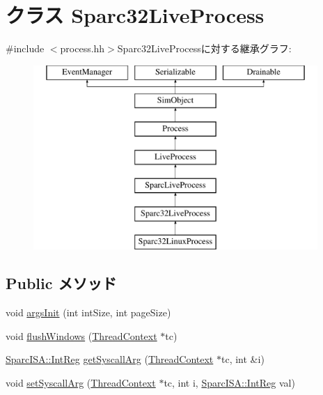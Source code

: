\hypertarget{classSparc32LiveProcess}{
\section{クラス Sparc32LiveProcess}
\label{classSparc32LiveProcess}
}


{\ttfamily \#include $<$process.hh$>$}Sparc32LiveProcessに対する継承グラフ:\begin{figure}[H]
\begin{center}
\leavevmode
\includegraphics[height=7cm]{classSparc32LiveProcess}
\end{center}
\end{figure}
\subsection*{Public メソッド}
\begin{DoxyCompactItemize}
\item 
void \hyperlink{classSparc32LiveProcess_a60e5314ffeede1e51c6bcb2cf606ca92}{argsInit} (int intSize, int pageSize)
\item 
void \hyperlink{classSparc32LiveProcess_ac36137c98f2b65736e0c5745c3c90c85}{flushWindows} (\hyperlink{classThreadContext}{ThreadContext} $\ast$tc)
\item 
\hyperlink{namespaceSparcISA_a0e080577527fb3e9685399f75b5caf15}{SparcISA::IntReg} \hyperlink{classSparc32LiveProcess_abab14482db5480cf54186cb10b08491e}{getSyscallArg} (\hyperlink{classThreadContext}{ThreadContext} $\ast$tc, int \&i)
\item 
void \hyperlink{classSparc32LiveProcess_acab5265ebb2016965a75bd93006c36d3}{setSyscallArg} (\hyperlink{classThreadContext}{ThreadContext} $\ast$tc, int i, \hyperlink{namespaceSparcISA_a0e080577527fb3e9685399f75b5caf15}{SparcISA::IntReg} val)
\end{DoxyCompactItemize}
